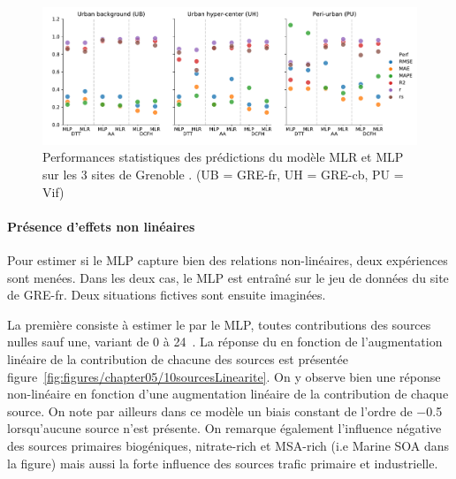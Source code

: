 \begin{figure}[ht]
    \centering
    \includegraphics[width=1.0\linewidth]{figures/chapter05/perfMLPMLR.pdf}
    \caption{Performances statistiques des prédictions du modèle MLR et MLP sur les 3
    sites de Grenoble \autocite{borlazaUrbaninprep.}. (UB = GRE-fr, UH = GRE-cb, PU = Vif)}%
    \label{fig:perfMLPMLR}
\end{figure}


\paragraph{Présence d'effets non linéaires}%
\label{par:présence_d_effets_non_linéaires}

Pour estimer si le MLP capture bien des relations non-linéaires, deux expériences sont
menées.  Dans les deux cas, le MLP est entraîné sur le jeu de données du site de GRE-fr.
Deux situations fictives sont ensuite imaginées.

La première consiste à estimer le \PODTTv{} par le MLP, toutes contributions des sources
nulles sauf une, variant de 0 à 24~\si{\ugm}. La réponse du \PODTTv{} en fonction de
l'augmentation linéaire de la contribution de chacune des sources est présentée
figure~\ref{fig:figures/chapter05/10sourcesLinearite}. On y observe bien une réponse
non-linéaire en fonction d'une augmentation linéaire de la contribution de
chaque source. On note par ailleurs dans ce modèle un biais constant de l'ordre de
\SI{-0.5}{\opv} lorsqu'aucune source n'est présente.
On remarque également l'influence négative des sources primaires biogéniques, nitrate-rich
et MSA-rich (i.e Marine SOA dans la figure) mais aussi la forte influence des sources
trafic primaire et industrielle.

